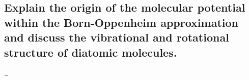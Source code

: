 \subsection{Explain the origin of the molecular potential within the Born-Oppenheim approximation and discuss the vibrational and rotational structure of diatomic molecules.}


\ldots